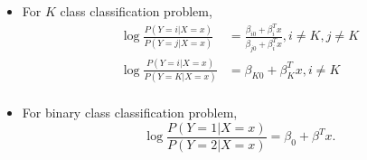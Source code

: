 \begin{refsection}
\begin{remark}\hfill
	\begin{itemize}
		\item For $K$ class classification problem,
		\begin{align*}
		\log \frac{P(Y = i|X=x)}{P(Y = j|X=x)} &= \frac{\beta_{i0} + \beta_i^Tx}{\beta_{j0} + \beta_i^Tx}, i\neq K, j\neq K \\
		\log \frac{P(Y = i|X=x)}{P(Y = K|X=x)} &= \beta_{K0} + \beta_K^Tx, i\neq K \\
		\end{align*}
		\item For binary class classification problem,
		$$\log \frac{P(Y = 1|X=x)}{P(Y = 2|X=x)} = \beta_{0} + \beta^Tx.$$
	\end{itemize}	
\end{remark}



\end{refsection}
